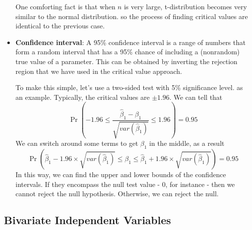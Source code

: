 \documentclass[12pt]{article}
\theoremstyle{definition}
\theoremstyle{property}
\theoremstyle{assumption}
\theoremstyle{example}
\theoremstyle{comment}
\begin{document}
\begin{itemize}
One comforting fact is that when $n$ is very large, t-distribution becomes very similar to the normal distribution. so the process of finding critical values are identical to the previous case.
\item \textbf{Confidence interval}: A 95\% confidence interval is a range of numbers that form a random interval that has a 95\% chance of including a (nonrandom) true value of a parameter. This can be obtained by inverting the rejection region that we have used in the critical value approach. \par\medskip
To make this simple, let's use a two-sided test  with 5\% significance level. as an example. Typically, the critical values are $\pm1.96$. We can tell that 
\[
\Pr\left(-1.96\leq \frac{\hat{\beta}_1-\beta_1}{\sqrt{var(\hat{\beta}_1)}} \leq1.96\right)=0.95
\]
We can switch around some terms to get $\beta_1$ in the middle, as a result
\[
\Pr\left(\hat{\beta}_1-1.96\times\sqrt{var(\hat{\beta}_1)} \leq \beta_1 \leq\hat{\beta}_1+1.96\times\sqrt{var(\hat{\beta}_1)}\right)=0.95
\]
In this way, we can find the upper and lower bounds of the confidence intervals. If they encompass the null test value - 0, for instance - then we cannot reject the null hypothesis. Otherwise, we can reject the null. 
\end{itemize}

\subsection{Bivariate Independent Variables}
\end{document}

